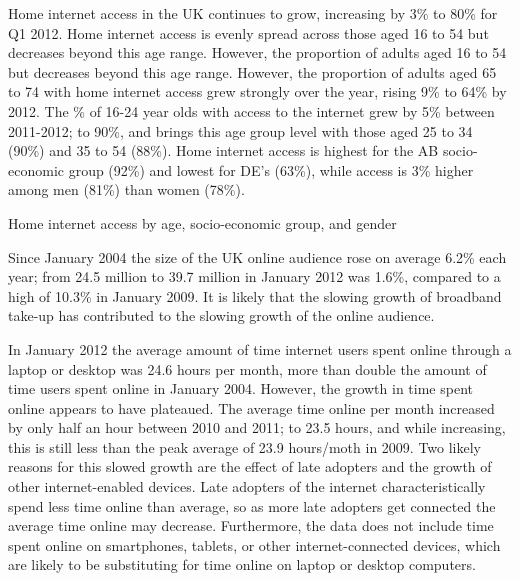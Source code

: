 \documentclass[letterpaper,10pt,openany,oneside,english]{sphinxmanual}
\begin{document}

Home internet access in the UK continues to grow, increasing by 3\% to 80\% for Q1 2012. Home internet access is evenly spread across those aged 16 to 54 but decreases beyond this age range. However, the proportion of adults aged 16 to 54 but decreases beyond this age range. However, the proportion of adults aged 65 to 74 with home internet access grew strongly over the year, rising 9\% to 64\% by 2012. The \% of 16-24 year olds with access to the internet grew by 5\% between 2011-2012; to 90\%, and brings this age group level with those aged 25 to 34 (90\%) and 35 to 54 (88\%). Home internet access is highest for the AB socio-economic group (92\%) and lowest for DE’s (63\%), while access is 3\% higher among men (81\%) than women (78\%).

Home internet access by age, socio-economic group, and gender

Since January 2004 the size of the UK online audience rose on average 6.2\% each year; from 24.5 million to 39.7 million in January 2012 was 1.6\%, compared to a high of 10.3\% in January 2009. It is likely that the slowing growth of broadband take-up has contributed to the slowing growth of the online audience.


In January 2012 the average amount of time internet users spent online through a laptop or desktop was 24.6 hours per month, more than double the amount of time users spent online in January 2004. However, the growth in time spent online appears to have plateaued. The average time online per month increased by only half an hour between 2010 and 2011; to 23.5 hours, and while increasing, this is still less than the peak average of 23.9 hours/moth in 2009. Two likely reasons for this slowed growth are the effect of late adopters and the growth of other internet-enabled devices. Late adopters of the internet characteristically spend less time online than average, so as more late adopters get connected the average time online may decrease. Furthermore, the data does not include time spent online on smartphones, tablets, or other internet-connected devices, which are likely to be substituting for time online on laptop or desktop computers.
\end{document}
